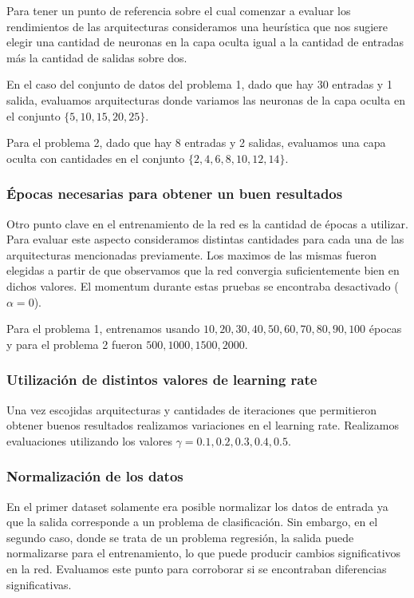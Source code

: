 \documentclass[informe.tex]{subfiles}
\begin{document}
      Para tener un punto de referencia sobre el cual comenzar a evaluar los rendimientos de las arquitecturas consideramos una heurística que nos sugiere elegir una cantidad de neuronas en la capa oculta igual a la cantidad de entradas más la cantidad de salidas sobre dos\cite{nnwithJava}.
      
      En el caso del conjunto de datos del problema 1, dado que hay 30 entradas y 1 salida, evaluamos arquitecturas donde variamos las neuronas de la capa oculta en el conjunto $\{5,10,15,20,25\}$. 
      
      Para el problema 2, dado que hay 8 entradas y 2 salidas, evaluamos una capa oculta con cantidades en el conjunto $\{2,4,6,8,10,12,14\}$.
    
    
    \subsubsection{\'Epocas necesarias para obtener un buen resultados}
      Otro punto clave en el entrenamiento de la red es la cantidad de \'epocas a utilizar. Para evaluar este aspecto consideramos distintas cantidades para cada una de las arquitecturas mencionadas previamente. Los maximos de las mismas fueron elegidas a partir de que observamos que la red convergia suficientemente bien en dichos valores. El momentum durante estas pruebas se encontraba desactivado ($\alpha = 0$).
      
      Para el problema 1, entrenamos usando $10, 20, 30, 40, 50, 60, 70, 80, 90, 100$ \'epocas y para el problema 2 fueron $500, 1000, 1500, 2000$.
    
    
    \subsubsection{Utilizaci\'on de distintos valores de learning rate}
      Una vez escojidas arquitecturas y cantidades de iteraciones que permitieron obtener buenos resultados realizamos variaciones en el learning rate. Realizamos evaluaciones utilizando los valores $\gamma = 0.1, 0.2, 0.3, 0.4, 0.5 $.
    
    \subsubsection{Normalización de los datos}
      En el primer dataset solamente era posible normalizar los datos de entrada ya que la salida corresponde a un problema de clasificación. Sin embargo, en el segundo caso, donde se trata de un problema regresión, la salida puede normalizarse para el entrenamiento, lo que puede producir cambios significativos en la red. Evaluamos este punto para corroborar si se encontraban diferencias significativas.
      
\end{document}
